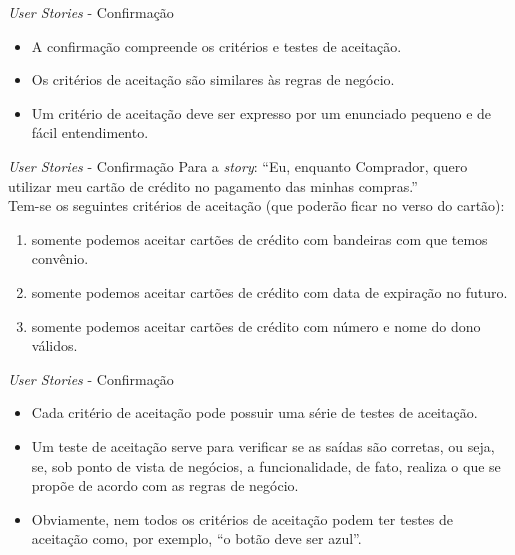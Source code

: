 \documentclass[11pt]{beamer}
\begin{document}
   \begin{frame}{\textit{User Stories} - Confirmação}
      \begin{itemize}
         \item A confirmação compreende os critérios e testes de aceitação.
         \item Os critérios de aceitação são similares às regras de negócio.
         \item Um critério de aceitação deve ser expresso por um enunciado pequeno e de fácil entendimento.
      \end{itemize}
   \end{frame}

   \begin{frame}{\textit{User Stories} - Confirmação}
      Para a \textit{story}: ``Eu, enquanto Comprador, quero utilizar meu cartão de crédito no pagamento das minhas compras.''\\
      Tem-se os seguintes critérios de aceitação (que poderão ficar no verso do cartão):
      \begin{enumerate}
         \item somente podemos aceitar cartões de crédito com bandeiras com que temos convênio.
         \item somente podemos aceitar cartões de crédito com data de expiração no futuro.
         \item somente podemos aceitar cartões de crédito com número e nome do dono válidos.
      \end{enumerate}
   \end{frame}

   \begin{frame}{\textit{User Stories} - Confirmação}
      \begin{itemize}
         \item Cada critério de aceitação pode possuir uma série de testes de aceitação.
         \item Um teste de aceitação serve para verificar se as saídas são corretas, ou seja, se, sob ponto de vista de negócios, a funcionalidade, de fato, realiza o que se propõe de acordo com as regras de negócio.
         \item Obviamente, nem todos os critérios de aceitação podem ter testes de aceitação como, por exemplo, ``o botão deve ser azul''.
      \end{itemize}
   \end{frame}
\end{document}
